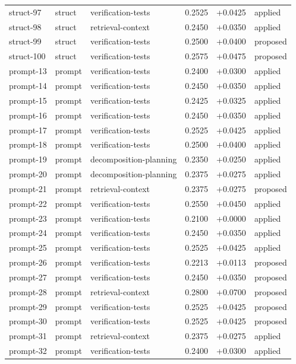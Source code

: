 \begin{center}
\begin{longtable}{llp{5.2cm}rrl}
struct-97 & struct & verification-tests & 0.2525 & +0.0425 & applied \\
struct-98 & struct & retrieval-context & 0.2450 & +0.0350 & applied \\
struct-99 & struct & verification-tests & 0.2500 & +0.0400 & proposed \\
struct-100 & struct & verification-tests & 0.2575 & +0.0475 & proposed \\
prompt-13 & prompt & verification-tests & 0.2400 & +0.0300 & applied \\
prompt-14 & prompt & verification-tests & 0.2450 & +0.0350 & applied \\
prompt-15 & prompt & verification-tests & 0.2425 & +0.0325 & applied \\
prompt-16 & prompt & verification-tests & 0.2450 & +0.0350 & applied \\
prompt-17 & prompt & verification-tests & 0.2525 & +0.0425 & applied \\
prompt-18 & prompt & verification-tests & 0.2500 & +0.0400 & applied \\
prompt-19 & prompt & decomposition-planning & 0.2350 & +0.0250 & applied \\
prompt-20 & prompt & decomposition-planning & 0.2375 & +0.0275 & applied \\
prompt-21 & prompt & retrieval-context & 0.2375 & +0.0275 & proposed \\
prompt-22 & prompt & verification-tests & 0.2550 & +0.0450 & applied \\
prompt-23 & prompt & verification-tests & 0.2100 & +0.0000 & applied \\
prompt-24 & prompt & verification-tests & 0.2450 & +0.0350 & applied \\
prompt-25 & prompt & verification-tests & 0.2525 & +0.0425 & applied \\
prompt-26 & prompt & verification-tests & 0.2213 & +0.0113 & proposed \\
prompt-27 & prompt & verification-tests & 0.2450 & +0.0350 & proposed \\
prompt-28 & prompt & retrieval-context & 0.2800 & +0.0700 & proposed \\
prompt-29 & prompt & verification-tests & 0.2525 & +0.0425 & proposed \\
prompt-30 & prompt & verification-tests & 0.2525 & +0.0425 & proposed \\
prompt-31 & prompt & retrieval-context & 0.2375 & +0.0275 & applied \\
prompt-32 & prompt & verification-tests & 0.2400 & +0.0300 & applied \\

\end{longtable}
\end{center}
